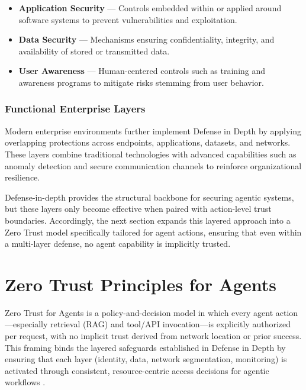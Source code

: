 \begin{TNtwocol}
\begin{itemize}
                  \smallskip

            \item \textbf{Application Security} — Controls embedded within or applied around software systems to prevent vulnerabilities and exploitation.\cite{NIST_SP800_218}

                  \smallskip

            \item \textbf{Data Security} — Mechanisms ensuring confidentiality, integrity, and availability of stored or transmitted data.\cite{FIPS_199}

                  \smallskip

            \item \textbf{User Awareness} — Human-centered controls such as training and awareness programs to mitigate risks stemming from user behavior.\cite{NIST_SP800_50R1}
      \end{itemize}

      \subsubsection{Functional Enterprise Layers}

      \medskip

      Modern enterprise environments further implement Defense in Depth by applying overlapping protections across endpoints, applications, datasets, and networks. These layers combine traditional technologies with advanced capabilities such as anomaly detection and secure communication channels to reinforce organizational resilience.\cite{NIST_SP800_137}

      \medskip

      Defense-in-depth provides the structural backbone for securing agentic systems, but these layers only become effective when paired with action-level trust boundaries. Accordingly, the next section expands this layered approach into a Zero Trust model specifically tailored for agent actions, ensuring that even within a multi-layer defense, no agent capability is implicitly trusted.\cite{CISA_ZTMM_v2}

      \section{Zero Trust Principles for Agents}

      Zero Trust for Agents is a policy-and-decision model in which every agent action---especially retrieval (RAG) and tool/API invocation---is explicitly authorized per request, with no implicit trust derived from network location or prior success. This framing binds the layered safeguards established in Defense in Depth by ensuring that each layer (identity, data, network segmentation, monitoring) is activated through consistent, resource-centric access decisions for agentic workflows \cite{NIST_SP800_207,CIS_Controls_v8_1}.


\end{TNtwocol}
